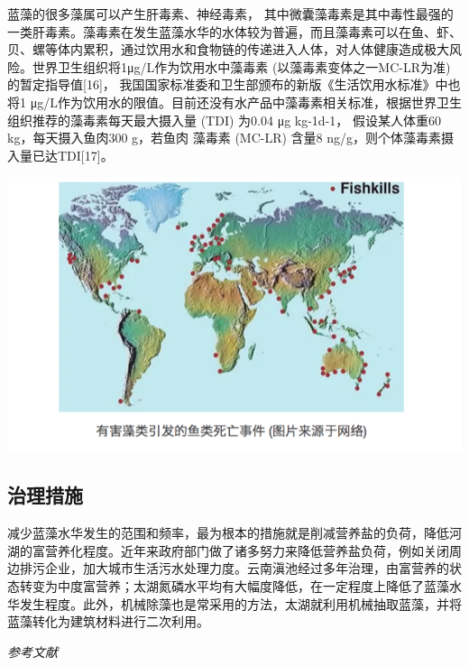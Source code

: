 \documentclass[
]{book}
\begin{document}
蓝藻的很多藻属可以产生肝毒素、神经毒素， 其中微囊藻毒素是其中毒性最强的一类肝毒素。藻毒素在发生蓝藻水华的水体较为普遍，而且藻毒素可以在鱼、虾、贝、螺等体内累积，通过饮用水和食物链的传递进入人体，对人体健康造成极大风险。世界卫生组织将1μg/L作为饮用水中藻毒素 (以藻毒素变体之一MC-LR为准) 的暂定指导值{[}16{]}， 我国国家标准委和卫生部颁布的新版《生活饮用水标准》中也将1 μg/L作为饮用水的限值。目前还没有水产品中藻毒素相关标准，根据世界卫生组织推荐的藻毒素每天最大摄入量 (TDI) 为0.04 μg kg-1d-1， 假设某人体重60 kg，每天摄入鱼肉300 g，若鱼肉 藻毒素 (MC-LR) 含量8 ng/g，则个体藻毒素摄入量已达TDI{[}17{]}。

\includegraphics[width=8.33in]{images/lanzao3}

\hypertarget{ux6cbbux7406ux63aaux65bd}{%
\subsection{治理措施}\label{ux6cbbux7406ux63aaux65bd}}

减少蓝藻水华发生的范围和频率，最为根本的措施就是削减营养盐的负荷，降低河湖的富营养化程度。近年来政府部门做了诸多努力来降低营养盐负荷，例如关闭周边排污企业，加大城市生活污水处理力度。云南滇池经过多年治理，由富营养的状态转变为中度富营养；太湖氮磷水平均有大幅度降低，在一定程度上降低了蓝藻水华发生程度。此外，机械除藻也是常采用的方法，太湖就利用机械抽取蓝藻，并将蓝藻转化为建筑材料进行二次利用。

\emph{参考文献}
\end{document}
